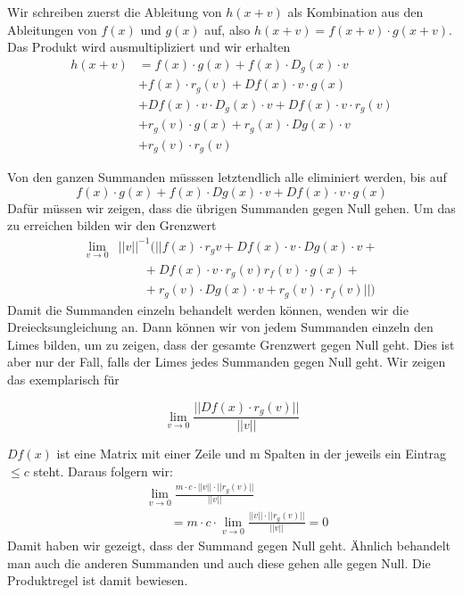 Wir schreiben zuerst die Ableitung von $h(x+v)$ als Kombination aus den Ableitungen von $f(x)$ und $g(x)$ auf, also $h(x+v) =  f(x+v)\cdot g(x+v)$.
Das Produkt wird ausmultipliziert und wir erhalten
\begin{equation*}
\begin{split} h(x+v) & = f(x) \cdot g(x)  + f(x)  \cdot D_{g}(x) \cdot v \\ & + f(x) \cdot r_{g}(v) + Df(x) \cdot v \cdot g(x) \\ & +  Df(x) \cdot v \cdot D_{g}(x) \cdot v  + Df(x) \cdot v \cdot r_{g}(v) \\ & +  r_{g}(v) \cdot g(x) + r_{g}(x) \cdot Dg(x) \cdot v \\ & + r_{g}(v) \cdot r_{g}(v) \end{split} \end{equation*}   %

Von den ganzen Summanden müsssen letztendlich alle eliminiert werden, bis auf 
\begin{equation*} f(x) \cdot g(x) + f(x) \cdot Dg(x) \cdot v + Df(x) \cdot v \cdot g(x) \end{equation*} 
Dafür müssen wir zeigen, dass die übrigen Summanden gegen Null gehen. Um das zu erreichen bilden wir den Grenzwert
\begin{align*}
\lim \limits_{v \rightarrow 0} &||v||^{-1}(||f(x) \cdot r_{g}v + Df(x) \cdot v \cdot Dg(x) \cdot v +{}\\
&\qquad + Df(x) \cdot v \cdot r_{g}(v) r_{f}(v) \cdot g(x) +{}\\
&\qquad + r_{g}(v) \cdot Dg(x) \cdot v + r_{g}(v) \cdot r_{f}(v)||)
\end{align*}
Damit die Summanden einzeln behandelt werden können, wenden wir die Dreiecksungleichung an. Dann können wir von jedem Summanden einzeln den Limes bilden, um zu zeigen, dass der gesamte Grenzwert gegen Null geht. Dies ist aber nur der Fall, falls der Limes jedes Summanden gegen Null geht. Wir zeigen das exemplarisch für 

\begin{equation*}
\lim\limits_{v \rightarrow 0} \frac{||Df(x) \cdot r_{g}(v)||}{||v||}
\end{equation*}

$Df(x)$ ist eine Matrix mit einer Zeile und m Spalten in der jeweils ein Eintrag $\leq c$ steht. Daraus folgern wir:
\begin{align*}
&\lim\limits_{v \rightarrow 0} \frac{m \cdot c \cdot ||v|| \cdot ||r_{g}(v)||}{||v||}\\
&\qquad= m \cdot c \cdot \lim\limits_{v \rightarrow 0} \frac{ ||v|| \cdot ||r_{g}(v)||}{||v||} = 0
\end{align*} 
Damit haben wir gezeigt, dass der Summand gegen Null geht. Ähnlich behandelt man auch die anderen Summanden und auch diese gehen alle gegen Null.
Die Produktregel ist damit bewiesen. 













